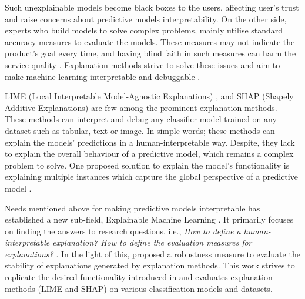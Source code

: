 \documentclass[english]{tktltiki2}
\theoremstyle{definition}
\theoremstyle{remark}
\begin{document}
Such unexplainable models become black boxes to the users, affecting user's trust and raise concerns about predictive models interpretability.
On the other side, experts who build models to solve complex problems, mainly utilise standard accuracy measures to evaluate the models. These measures may not indicate the product's goal every time, and having blind faith in such measures can harm the service quality \citep{lipton2016mythos, guidotti2018survey}. Explanation methods strive to solve these issues and aim to make machine learning interpretable and debuggable \citep{guidotti2018survey}.

LIME (Local Interpretable Model-Agnostic Explanations) \citep{ribeiro2016should}, and SHAP (Shapely Additive Explanations) \citep{lundberg2017unified} are few among the prominent explanation methods. These methods can interpret and debug any classifier model trained on any dataset such as tabular, text or image. In simple words; these methods can explain the models' predictions in a human-interpretable way. Despite, they lack to explain the overall behaviour of a predictive model, which remains a complex problem to solve. One proposed solution to explain the model's functionality is explaining multiple instances which capture the global perspective of a predictive model \citep{ribeiro2016should}.


Needs mentioned above for making predictive models interpretable has established a new sub-field, Explainable Machine Learning \citep{guidotti2018survey}. It primarily focuses on finding the answers to research questions, i.e., \textit{How to define a human-interpretable explanation? How to define the evaluation measures for explanations?} \citep{adhikari2018example, honegger2018shedding}. In the light of this, \citet{alvarez2018robustness} proposed a robustness measure to evaluate the stability of explanations generated by explanation methods. This work strives to replicate the desired functionality introduced in \citep{alvarez2018robustness} and evaluates explanation methods (LIME and SHAP) on various classification models and datasets.

%
\end{document}
